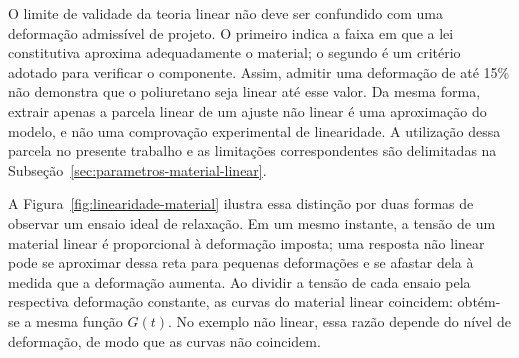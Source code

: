 \documentclass[arial,centeredequations,english,brazilian,oneside,section=TITLE]{ifes8}
\begin{document}
O limite de validade da teoria linear não deve ser confundido com uma deformação
admissível de projeto. O primeiro indica a faixa em que a lei constitutiva aproxima
adequadamente o material; o segundo é um critério adotado para verificar o componente.
Assim, admitir uma deformação de até 15\% não demonstra que o poliuretano seja linear
até esse valor. Da mesma forma, extrair apenas a parcela linear de um ajuste não linear
é uma aproximação do modelo, e não uma comprovação experimental de linearidade.
A utilização dessa parcela no presente trabalho e as limitações correspondentes são
delimitadas na Subseção~\ref{sec:parametros-material-linear}.

A Figura~\ref{fig:linearidade-material} ilustra essa distinção por duas formas de
observar um ensaio ideal de relaxação. Em um mesmo instante, a tensão de um
material linear é proporcional à deformação imposta; uma resposta não linear
pode se aproximar dessa reta para pequenas deformações e se afastar dela
à medida que a deformação aumenta. Ao dividir a tensão de cada ensaio pela
respectiva deformação constante, as curvas do material linear coincidem:
obtém-se a mesma função $G(t)$. No exemplo não linear, essa razão depende
do nível de deformação, de modo que as curvas não coincidem.
\end{document}
